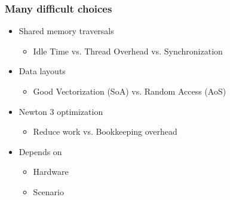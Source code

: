 \documentclass[
	10pt,
	t		%
]{beamer}
\begin{document}
\begin{frame}
    \frametitle{Many difficult choices}
    \begin{itemize}
        \item Shared memory traversals
              \begin{itemize}
                  \item Idle Time vs. Thread Overhead vs. Synchronization
              \end{itemize}
        \item Data layouts
              \begin{itemize}
                  \item Good Vectorization (SoA) vs. Random Access (AoS)
              \end{itemize}
        \item Newton 3 optimization
              \begin{itemize}
                  \item Reduce work vs. Bookkeeping overhead
              \end{itemize}

        \item Depends on
              \begin{itemize}
                  \item Hardware
                  \item Scenario
              \end{itemize}
    \end{itemize}

\end{frame}
\end{document}
